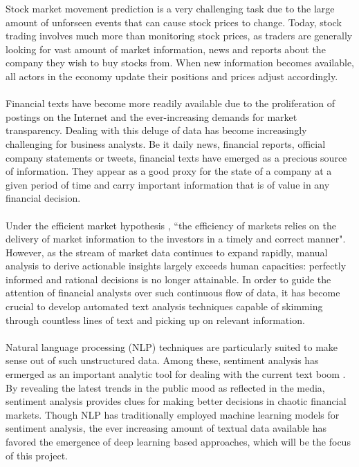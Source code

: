 \documentclass[final]{cvpr}
\begin{document}
Stock market movement prediction is a very challenging task due to the large amount of unforseen events that can cause stock prices to change. Today, stock trading involves much more than monitoring stock prices, as traders are generally looking for vast amount of market information, news and reports about the company they wish to buy stocks from. When new information becomes available, all actors in the economy update their positions and prices adjust accordingly.\\
\\
Financial texts have become more readily available due to the proliferation of postings on the Internet and the ever-increasing demands for market transparency. Dealing with this deluge of data has become increasingly challenging for business analysts. Be it daily news, financial reports, official company statements or tweets, financial texts have emerged as a precious source of information. They appear as a good proxy for the state of a company at a given period of time and carry important information that is of value in any financial decision.\\
\\
Under the efficient market hypothesis \cite{hypothesis}, “the efficiency of markets relies on the delivery of market information to the investors in a timely and correct manner". However, as the stream of market data continues to expand rapidly, manual analysis to derive actionable insights largely exceeds human capacities: perfectly informed and rational decisions is no longer attainable. In order to guide the attention of financial analysts over such continuous flow of data, it has become crucial to develop automated text analysis techniques capable of skimming through countless lines of text and picking up on relevant information.\\
\\
Natural language processing (NLP) techniques are particularly suited to make sense out of such unstructured data. Among these, sentiment analysis has ermerged as an important analytic tool for dealing with the current text boom \cite{headlines}. By revealing the latest trends in the public mood as reflected in the media, sentiment analysis provides clues for making better decisions in chaotic financial markets. Though NLP has traditionally employed machine learning models for sentiment analysis, the ever increasing amount of textual data available has favored the emergence of deep learning based approaches, which will be the focus of this project.
\end{document}

